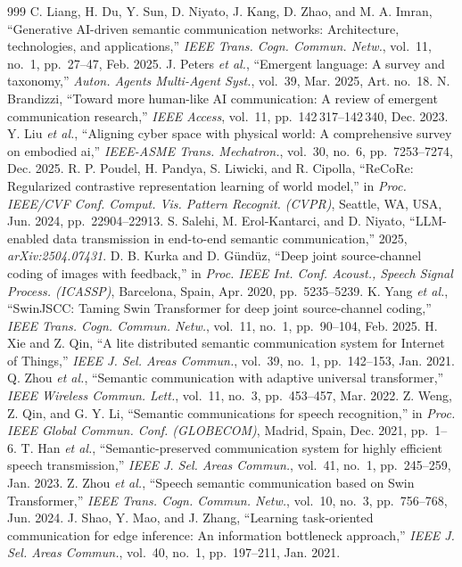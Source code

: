 \begin{thebibliography}{999}
 C. Liang, H. Du, Y. Sun, D. Niyato, J. Kang, D. Zhao, and M. A. Imran, ``Generative AI-driven semantic communication networks: Architecture, technologies, and applications,'' \emph{IEEE Trans. Cogn. Commun. Netw.}, vol.~11, no.~1, pp.~27--47, Feb. 2025.
 J. Peters \emph{et al.}, ``Emergent language: A survey and taxonomy,'' \emph{Auton. Agents Multi-Agent Syst.}, vol.~39, Mar. 2025, Art. no.~18.
 N. Brandizzi, ``Toward more human-like AI communication: A review of emergent communication research,'' \emph{IEEE Access}, vol.~11, pp.~142\,317--142\,340, Dec. 2023.
 Y. Liu \emph{et al.}, ``Aligning cyber space with physical world: A comprehensive survey on embodied ai,'' \emph{IEEE-ASME Trans. Mechatron.}, vol.~30, no.~6, pp.~7253--7274, Dec. 2025.
 R. P. Poudel, H. Pandya, S. Liwicki, and R. Cipolla, ``ReCoRe: Regularized contrastive representation learning of world model,'' in \emph{Proc. IEEE/CVF Conf. Comput. Vis. Pattern Recognit. (CVPR)}, Seattle, WA, USA, Jun. 2024, pp.~22904--22913.
 S. Salehi, M. Erol-Kantarci, and D. Niyato, ``LLM-enabled data transmission in end-to-end semantic communication,'' 2025, \emph{arXiv:2504.07431}.
 D. B. Kurka and D. Gündüz, ``Deep joint source-channel coding of images with feedback,'' in \emph{Proc. IEEE Int. Conf. Acoust., Speech Signal Process. (ICASSP)}, Barcelona, Spain, Apr. 2020, pp.~5235--5239.
 K. Yang \emph{et al.}, ``SwinJSCC: Taming Swin Transformer for deep joint source-channel coding,'' \emph{IEEE Trans. Cogn. Commun. Netw.}, vol.~11, no.~1, pp.~90--104, Feb. 2025.
 H. Xie and Z. Qin, ``A lite distributed semantic communication system for Internet of Things,'' \emph{IEEE J. Sel. Areas Commun.}, vol.~39, no.~1, pp.~142--153, Jan. 2021.
 Q. Zhou \emph{et al.}, ``Semantic communication with adaptive universal transformer,'' \emph{IEEE Wireless Commun. Lett.}, vol.~11, no.~3, pp.~453--457, Mar. 2022.
 Z. Weng, Z. Qin, and G. Y. Li, ``Semantic communications for speech recognition,'' in \emph{Proc. IEEE Global Commun. Conf. (GLOBECOM)}, Madrid, Spain, Dec. 2021, pp.~1--6.
 T. Han \emph{et al.}, ``Semantic-preserved communication system for highly efficient speech transmission,'' \emph{IEEE J. Sel. Areas Commun.}, vol.~41, no.~1, pp.~245--259, Jan. 2023.
 Z. Zhou \emph{et al.}, ``Speech semantic communication based on Swin Transformer,'' \emph{IEEE Trans. Cogn. Commun. Netw.}, vol.~10, no.~3, pp.~756--768, Jun. 2024.
 J. Shao, Y. Mao, and J. Zhang, ``Learning task-oriented communication for edge inference: An information bottleneck approach,'' \emph{IEEE J. Sel. Areas Commun.}, vol.~40, no.~1, pp.~197--211, Jan. 2021.

\end{thebibliography}
